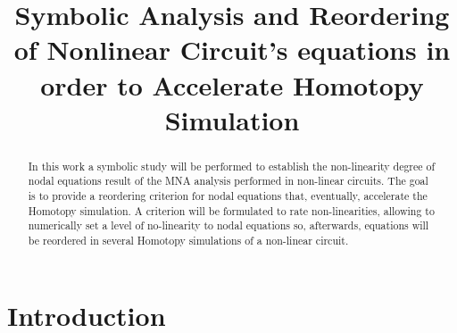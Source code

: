 \documentclass[conference,letterpaper,onecolumn,11pt]{IEEEtran}
\begin{document}
\title{Symbolic Analysis and Reordering of Nonlinear Circuit's equations in order to Accelerate Homotopy Simulation}

\author{
\and
{}
\and
{}
\and
{}
}

\begin{singlespace}
\maketitle
\end{singlespace}

\begin{abstract}
In this work a symbolic study will be performed to establish the non-linearity degree of nodal equations result of the MNA analysis performed in non-linear circuits. The goal is to provide a reordering criterion for nodal equations that, eventually, accelerate the Homotopy simulation. A criterion will be formulated to rate non-linearities, allowing to numerically set a level of no-linearity to nodal equations so, afterwards, equations will be reordered in several Homotopy simulations of a non-linear circuit.
\end{abstract}

\section{Introduction}
\end{document}
